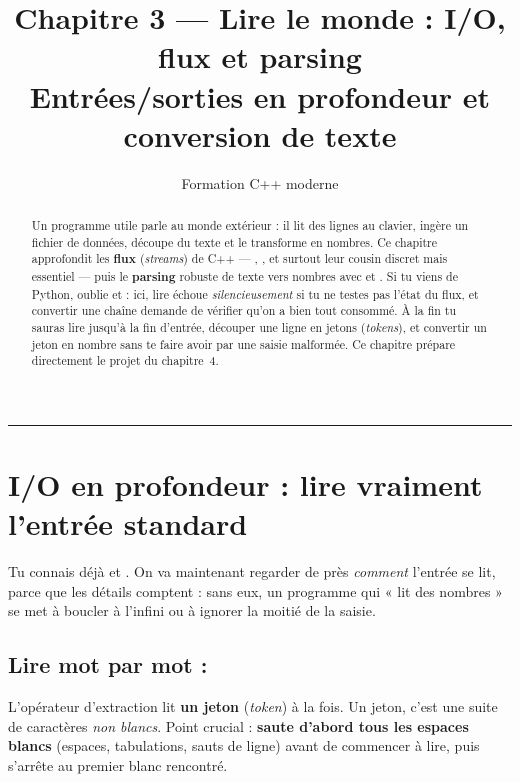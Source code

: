 \documentclass[11pt]{article}
\title{\textbf{Chapitre 3 — Lire le monde : I/O, flux et parsing}\\[0.3em]
       \large Entrées/sorties en profondeur et conversion de texte}
\author{Formation C++ moderne}
\date{}
\begin{document}
\maketitle

\begin{abstract}
\noindent Un programme utile parle au monde extérieur : il lit des lignes au
clavier, ingère un fichier de données, découpe du texte et le transforme en
nombres. Ce chapitre approfondit les \textbf{flux} (\emph{streams}) de C++ —
, , et surtout leur cousin discret mais essentiel
 — puis le \textbf{parsing} robuste de texte vers
nombres avec  et . Si tu viens de Python, oublie
 et  : ici, lire échoue \emph{silencieusement} si tu
ne testes pas l'état du flux, et convertir une chaîne demande de vérifier qu'on
a bien tout consommé. À la fin tu sauras lire jusqu'à la fin d'entrée, découper
une ligne en jetons (\emph{tokens}), et convertir un jeton en nombre sans te
faire avoir par une saisie malformée. Ce chapitre prépare directement le projet
du chapitre~4.
\end{abstract}

\tableofcontents
\bigskip\hrule\bigskip

\section{I/O en profondeur : lire vraiment l'entrée standard}

Tu connais déjà  et . On va maintenant
regarder de près \emph{comment} l'entrée se lit, parce que les détails comptent :
sans eux, un programme qui « lit des nombres » se met à boucler à l'infini ou à
ignorer la moitié de la saisie.

\subsection*{Lire mot par mot : }

L'opérateur d'extraction \code{>>} lit \textbf{un jeton} (\emph{token}) à la fois.
Un jeton, c'est une suite de caractères \emph{non blancs}. Point crucial :
\code{>>} \textbf{saute d'abord tous les espaces blancs} (espaces, tabulations,
sauts de ligne) avant de commencer à lire, puis s'arrête au premier blanc
rencontré.
\end{document}
